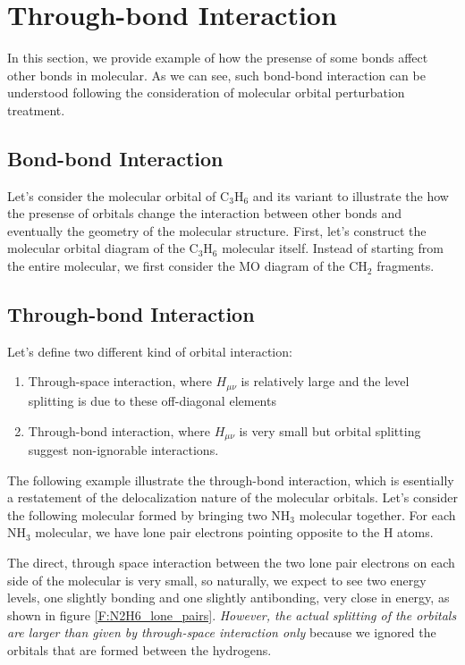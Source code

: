 \documentclass{article}
\begin{document}
\section{Through-bond Interaction}
In this section, we provide example of how the presense of some bonds 
affect other bonds in molecular. As we can see, such bond-bond interaction 
can be understood following the consideration of molecular orbital 
perturbation treatment. 

\subsection{Bond-bond Interaction}
Let's consider the molecular orbital of C$_3$H$_6$ and its variant to illustrate the 
how the presense of orbitals change the interaction between other bonds and eventually the 
geometry of the molecular structure. First, let's construct the molecular orbital diagram 
of the C$_3$H$_6$ molecular itself. Instead of starting from the entire molecular, we first 
consider the MO diagram of the CH$_2$ fragments.  

\subsection{Through-bond Interaction}
Let's define two different kind of orbital interaction:
\begin{enumerate}
    \item Through-space interaction, where $H_{\mu\nu}$ is relatively large and the level splitting is due to these off-diagonal elements
    \item Through-bond interaction, where $H_{\mu\nu}$ is very small but orbital splitting suggest non-ignorable interactions. 
\end{enumerate}
The following example illustrate the through-bond interaction, which is esentially a restatement of the delocalization 
nature of the molecular orbitals. Let's consider the following molecular formed by bringing two NH$_3$ molecular together. 
For each NH$_3$ molecular, we have lone pair electrons pointing opposite to the H atoms. 

The direct, through space interaction between the two lone pair electrons on each side of the molecular is very small, so 
naturally, we expect to see two energy levels, one slightly bonding and one slightly antibonding, very close in energy, as 
shown in figure \ref{F:N2H6_lone_pairs}. \emph{However, the actual splitting of the orbitals are larger than given by 
through-space interaction only} because we ignored the orbitals that are formed between the hydrogens. 
\end{document}

